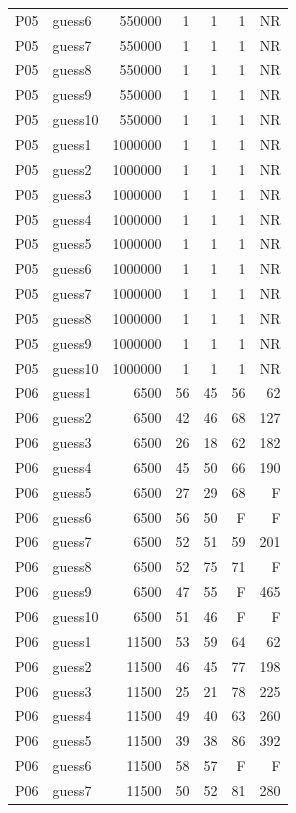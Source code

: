 {\begin{longtable}{llrrrrr}
P05 & guess6 & 550000 & 1 & 1 & 1 & NR \\
P05 & guess7 & 550000 & 1 & 1 & 1 & NR \\
P05 & guess8 & 550000 & 1 & 1 & 1 & NR \\
P05 & guess9 & 550000 & 1 & 1 & 1 & NR \\
P05 & guess10 & 550000 & 1 & 1 & 1 & NR \\
P05 & guess1 & 1000000 & 1 & 1 & 1 & NR \\
P05 & guess2 & 1000000 & 1 & 1 & 1 & NR \\
P05 & guess3 & 1000000 & 1 & 1 & 1 & NR \\
P05 & guess4 & 1000000 & 1 & 1 & 1 & NR \\
P05 & guess5 & 1000000 & 1 & 1 & 1 & NR \\
P05 & guess6 & 1000000 & 1 & 1 & 1 & NR \\
P05 & guess7 & 1000000 & 1 & 1 & 1 & NR \\
P05 & guess8 & 1000000 & 1 & 1 & 1 & NR \\
P05 & guess9 & 1000000 & 1 & 1 & 1 & NR \\
P05 & guess10 & 1000000 & 1 & 1 & 1 & NR \\
P06 & guess1 & 6500 & 56 & 45 & 56 & 62 \\
P06 & guess2 & 6500 & 42 & 46 & 68 & 127 \\
P06 & guess3 & 6500 & 26 & 18 & 62 & 182 \\
P06 & guess4 & 6500 & 45 & 50 & 66 & 190 \\
P06 & guess5 & 6500 & 27 & 29 & 68 & F \\
P06 & guess6 & 6500 & 56 & 50 & F & F \\
P06 & guess7 & 6500 & 52 & 51 & 59 & 201 \\
P06 & guess8 & 6500 & 52 & 75 & 71 & F \\
P06 & guess9 & 6500 & 47 & 55 & F & 465 \\
P06 & guess10 & 6500 & 51 & 46 & F & F \\
P06 & guess1 & 11500 & 53 & 59 & 64 & 62 \\
P06 & guess2 & 11500 & 46 & 45 & 77 & 198 \\
P06 & guess3 & 11500 & 25 & 21 & 78 & 225 \\
P06 & guess4 & 11500 & 49 & 40 & 63 & 260 \\
P06 & guess5 & 11500 & 39 & 38 & 86 & 392 \\
P06 & guess6 & 11500 & 58 & 57 & F & F \\
P06 & guess7 & 11500 & 50 & 52 & 81 & 280 \\

\end{longtable}}
